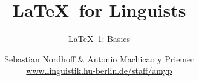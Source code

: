 


\title{
	\LaTeX\ for Linguists
}

\subtitle{\LaTeX\ 1: Basics}

\author[aMyP]{
	{\small Sebastian Nordhoff \& Antonio Machicao y Priemer}
	\\
	{\footnotesize \url{www.linguistik.hu-berlin.de/staff/amyp}}
}








\begin{frame}
  \HUtitle
\end{frame}





\nocite{Freitag&MyP15a}
\nocite{Knuth1986}
\nocite{Kopka94a}
\nocite{MyP17c}
\nocite{MyP&Kerkhof16a}
	


%
%
%
%
%


